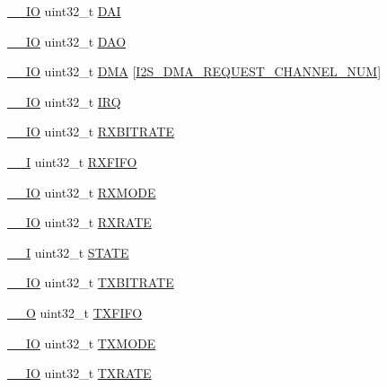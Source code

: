 \begin{DoxyCompactItemize}
\item 
\hyperlink{core__cm3_8h_aec43007d9998a0a0e01faede4133d6be}{\+\_\+\+\_\+\+IO} uint32\+\_\+t \hyperlink{structLPC__I2S__T_ab94e2f49e7d70f8b19c3d74f2e67878e}{D\+AI}
\item 
\hyperlink{core__cm3_8h_aec43007d9998a0a0e01faede4133d6be}{\+\_\+\+\_\+\+IO} uint32\+\_\+t \hyperlink{structLPC__I2S__T_ad574a0e2f1cdec634e05ee8176c0450e}{D\+AO}
\item 
\hyperlink{core__cm3_8h_aec43007d9998a0a0e01faede4133d6be}{\+\_\+\+\_\+\+IO} uint32\+\_\+t \hyperlink{structLPC__I2S__T_a2259283a5ad23aa09617861948df25d7}{D\+MA} \mbox{[}\hyperlink{group__I2S__17XX__40XX_ggac04c1583101ddd661886d9677683421bab9921186ab93fee889b2074d508b88ce}{I2\+S\+\_\+\+D\+M\+A\+\_\+\+R\+E\+Q\+U\+E\+S\+T\+\_\+\+C\+H\+A\+N\+N\+E\+L\+\_\+\+N\+UM}\mbox{]}
\item 
\hyperlink{core__cm3_8h_aec43007d9998a0a0e01faede4133d6be}{\+\_\+\+\_\+\+IO} uint32\+\_\+t \hyperlink{structLPC__I2S__T_a0ed73323cb1c577293f1416c6c55c47f}{I\+RQ}
\item 
\hyperlink{core__cm3_8h_aec43007d9998a0a0e01faede4133d6be}{\+\_\+\+\_\+\+IO} uint32\+\_\+t \hyperlink{structLPC__I2S__T_a3f0c2587313eb723ac48ad06af157df9}{R\+X\+B\+I\+T\+R\+A\+TE}
\item 
\hyperlink{core__cm3_8h_af63697ed9952cc71e1225efe205f6cd3}{\+\_\+\+\_\+I} uint32\+\_\+t \hyperlink{structLPC__I2S__T_aac5c44248c1354eb4320eb5fa5b18baa}{R\+X\+F\+I\+FO}
\item 
\hyperlink{core__cm3_8h_aec43007d9998a0a0e01faede4133d6be}{\+\_\+\+\_\+\+IO} uint32\+\_\+t \hyperlink{structLPC__I2S__T_a257e2de4bfa371adba9eeb4c2e95fe09}{R\+X\+M\+O\+DE}
\item 
\hyperlink{core__cm3_8h_aec43007d9998a0a0e01faede4133d6be}{\+\_\+\+\_\+\+IO} uint32\+\_\+t \hyperlink{structLPC__I2S__T_a03d51065fa11a182809e189b919b034a}{R\+X\+R\+A\+TE}
\item 
\hyperlink{core__cm3_8h_af63697ed9952cc71e1225efe205f6cd3}{\+\_\+\+\_\+I} uint32\+\_\+t \hyperlink{structLPC__I2S__T_a35299409c86d4860e936a7ff3e5603bf}{S\+T\+A\+TE}
\item 
\hyperlink{core__cm3_8h_aec43007d9998a0a0e01faede4133d6be}{\+\_\+\+\_\+\+IO} uint32\+\_\+t \hyperlink{structLPC__I2S__T_a16c60f11507aee3e4aef26c365a02ce2}{T\+X\+B\+I\+T\+R\+A\+TE}
\item 
\hyperlink{core__cm3_8h_a7e25d9380f9ef903923964322e71f2f6}{\+\_\+\+\_\+O} uint32\+\_\+t \hyperlink{structLPC__I2S__T_aa3a381d218c4342917885fa3a51e82d8}{T\+X\+F\+I\+FO}
\item 
\hyperlink{core__cm3_8h_aec43007d9998a0a0e01faede4133d6be}{\+\_\+\+\_\+\+IO} uint32\+\_\+t \hyperlink{structLPC__I2S__T_a30384953ab71a349e60ed555b4ec4552}{T\+X\+M\+O\+DE}
\item 
\hyperlink{core__cm3_8h_aec43007d9998a0a0e01faede4133d6be}{\+\_\+\+\_\+\+IO} uint32\+\_\+t \hyperlink{structLPC__I2S__T_ab62a8a48830412bcf4cec1b1ed5a5b21}{T\+X\+R\+A\+TE}
\end{DoxyCompactItemize}


